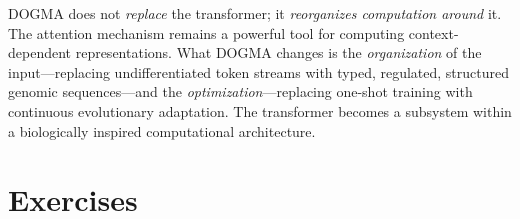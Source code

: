 \begin{implnote}
DOGMA does not \emph{replace} the transformer; it \emph{reorganizes computation around} it. The attention mechanism remains a powerful tool for computing context-dependent representations. What DOGMA changes is the \emph{organization} of the input---replacing undifferentiated token streams with typed, regulated, structured genomic sequences---and the \emph{optimization}---replacing one-shot training with continuous evolutionary adaptation. The transformer becomes a subsystem within a biologically inspired computational architecture.
\end{implnote}

\section{Exercises}
\label{sec:ch5-exercises}

